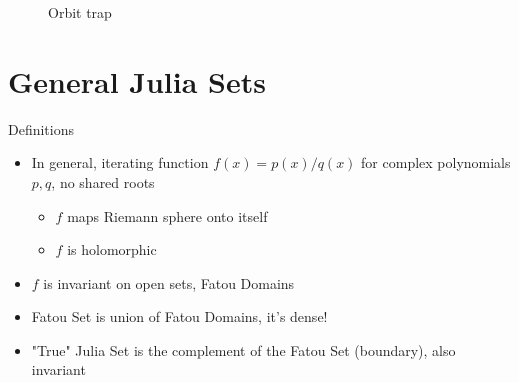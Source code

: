 \documentclass{article}
\begin{document}
\begin{figure}[!htbp]
    \centering
    \caption{Orbit trap} %
    \label{fig:OrbitTrap}%
\end{figure}%



\section{General Julia Sets}

Definitions
\begin{itemize}
    \item In general, iterating function $f(x) = p(x) / q(x)$ for complex polynomials $p, q$, no shared roots
    \begin{itemize}
        \item $f$ maps Riemann sphere onto itself
        \item $f$ is holomorphic
    \end{itemize}
    \item $f$ is invariant on open sets, Fatou Domains
    \item Fatou Set is union of Fatou Domains, it's dense!
    \item "True" Julia Set is the complement of the Fatou Set (boundary), also invariant
\end{itemize}
\end{document}
